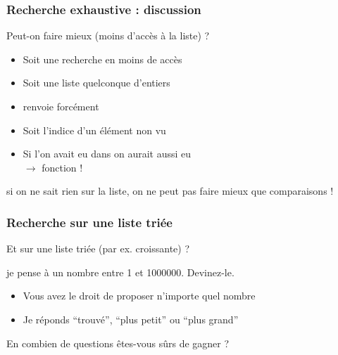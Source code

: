 \documentclass[12pt]{linfo-beamer}
\begin{document}
\begin{frame}
  \frametitle{Recherche exhaustive : discussion}

  Peut-on faire mieux (moins d'accès à la liste) ?

  \begin{itemize}
  \item Soit  une recherche en moins de 
    accès
  \item Soit  une liste quelconque d'entiers
  \item {} renvoie forcément 
  \item Soit  l'indice d'un élément non vu
  \item Si l'on avait eu  dans  on aurait aussi eu
    \\ $\longrightarrow$ fonction  !
  \end{itemize}

  \vfill

   si on ne sait rien sur la liste, on ne peut
  pas faire mieux que  comparaisons !


\end{frame}


\begin{frame}
  \frametitle{Recherche sur une liste triée}

  Et sur une liste triée (par ex. croissante) ?


  \vfill

   je pense à un nombre entre 1 et
  1000000. Devinez-le.

  \begin{itemize}
  \item Vous avez le droit de proposer n'importe quel nombre
  \item Je réponds ``trouvé'', ``plus petit'' ou ``plus grand''
  \end{itemize}

  En combien de questions êtes-vous sûrs de gagner ?
\end{frame}
\end{document}
